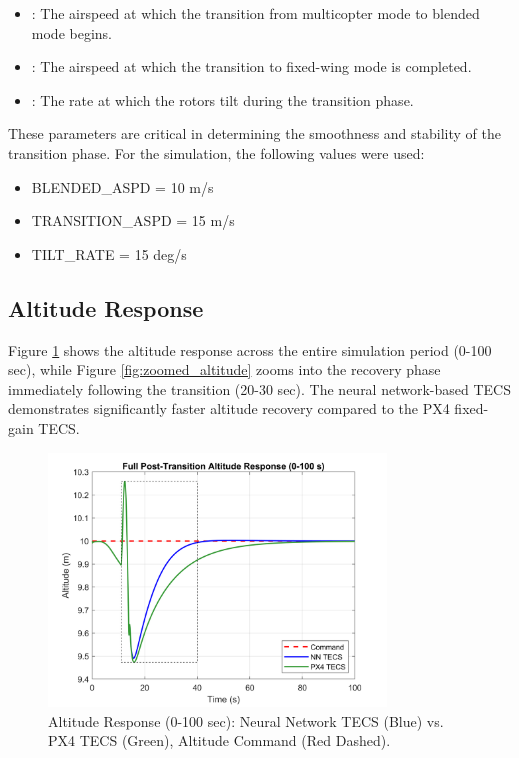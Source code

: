 \documentclass[journal,article,submit,pdftex,moreauthors]{Definitions/mdpi}
\begin{document}
\begin{itemize}
    \item {}: The airspeed at which the transition from multicopter mode to blended mode begins.
    \item {}: The airspeed at which the transition to fixed-wing mode is completed.
    \item {}: The rate at which the rotors tilt during the transition phase.
\end{itemize}

These parameters are critical in determining the smoothness and stability of the transition phase. For the simulation, the following values were used:
\begin{itemize}
    \item BLENDED\_ASPD = 10 m/s
    \item TRANSITION\_ASPD = 15 m/s
    \item TILT\_RATE = 15 deg/s
\end{itemize}

\subsection{Altitude Response}
Figure \ref{fig:full_altitude} shows the altitude response across the entire simulation period (0-100 sec), while Figure \ref{fig:zoomed_altitude} zooms into the recovery phase immediately following the transition (20-30 sec). The neural network-based TECS demonstrates significantly faster altitude recovery compared to the PX4 fixed-gain TECS.

\begin{figure}[H]
    \centering
    \includegraphics[width=0.8\textwidth]{full_altitude_plot.png}
    \caption{Altitude Response (0-100 sec): Neural Network TECS (Blue) vs. PX4 TECS (Green), Altitude Command (Red Dashed).}
    \label{fig:full_altitude}
\end{figure}
\end{document}
